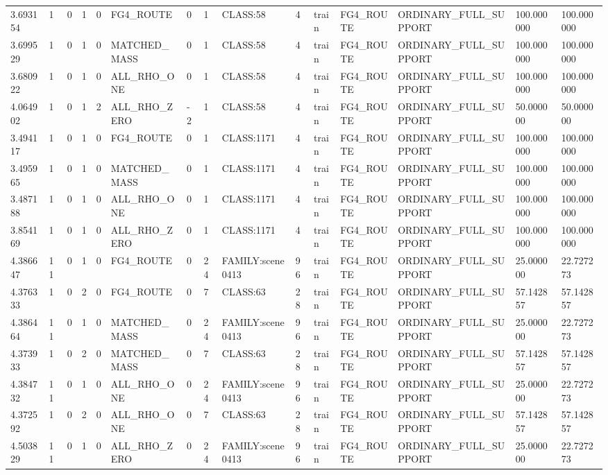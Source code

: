 \begin{tabular}{lllllllllllllll}
3.693154 & 1 & 0 & 1 & 0 & FG4\_ROUTE & 0 & 1 & CLASS:58 & 4 & train & FG4\_ROUTE & ORDINARY\_FULL\_SUPPORT & 100.000000 & 100.000000 \\
3.699529 & 1 & 0 & 1 & 0 & MATCHED\_MASS & 0 & 1 & CLASS:58 & 4 & train & FG4\_ROUTE & ORDINARY\_FULL\_SUPPORT & 100.000000 & 100.000000 \\
3.680922 & 1 & 0 & 1 & 0 & ALL\_RHO\_ONE & 0 & 1 & CLASS:58 & 4 & train & FG4\_ROUTE & ORDINARY\_FULL\_SUPPORT & 100.000000 & 100.000000 \\
4.064902 & 1 & 0 & 1 & 2 & ALL\_RHO\_ZERO & -2 & 1 & CLASS:58 & 4 & train & FG4\_ROUTE & ORDINARY\_FULL\_SUPPORT & 50.000000 & 50.000000 \\
3.494117 & 1 & 0 & 1 & 0 & FG4\_ROUTE & 0 & 1 & CLASS:1171 & 4 & train & FG4\_ROUTE & ORDINARY\_FULL\_SUPPORT & 100.000000 & 100.000000 \\
3.495965 & 1 & 0 & 1 & 0 & MATCHED\_MASS & 0 & 1 & CLASS:1171 & 4 & train & FG4\_ROUTE & ORDINARY\_FULL\_SUPPORT & 100.000000 & 100.000000 \\
3.487188 & 1 & 0 & 1 & 0 & ALL\_RHO\_ONE & 0 & 1 & CLASS:1171 & 4 & train & FG4\_ROUTE & ORDINARY\_FULL\_SUPPORT & 100.000000 & 100.000000 \\
3.854169 & 1 & 0 & 1 & 0 & ALL\_RHO\_ZERO & 0 & 1 & CLASS:1171 & 4 & train & FG4\_ROUTE & ORDINARY\_FULL\_SUPPORT & 100.000000 & 100.000000 \\
4.386647 & 11 & 0 & 1 & 0 & FG4\_ROUTE & 0 & 24 & FAMILY:scene0413 & 96 & train & FG4\_ROUTE & ORDINARY\_FULL\_SUPPORT & 25.000000 & 22.727273 \\
4.376333 & 1 & 0 & 2 & 0 & FG4\_ROUTE & 0 & 7 & CLASS:63 & 28 & train & FG4\_ROUTE & ORDINARY\_FULL\_SUPPORT & 57.142857 & 57.142857 \\
4.386464 & 11 & 0 & 1 & 0 & MATCHED\_MASS & 0 & 24 & FAMILY:scene0413 & 96 & train & FG4\_ROUTE & ORDINARY\_FULL\_SUPPORT & 25.000000 & 22.727273 \\
4.373933 & 1 & 0 & 2 & 0 & MATCHED\_MASS & 0 & 7 & CLASS:63 & 28 & train & FG4\_ROUTE & ORDINARY\_FULL\_SUPPORT & 57.142857 & 57.142857 \\
4.384732 & 11 & 0 & 1 & 0 & ALL\_RHO\_ONE & 0 & 24 & FAMILY:scene0413 & 96 & train & FG4\_ROUTE & ORDINARY\_FULL\_SUPPORT & 25.000000 & 22.727273 \\
4.372592 & 1 & 0 & 2 & 0 & ALL\_RHO\_ONE & 0 & 7 & CLASS:63 & 28 & train & FG4\_ROUTE & ORDINARY\_FULL\_SUPPORT & 57.142857 & 57.142857 \\
4.503829 & 11 & 0 & 1 & 0 & ALL\_RHO\_ZERO & 0 & 24 & FAMILY:scene0413 & 96 & train & FG4\_ROUTE & ORDINARY\_FULL\_SUPPORT & 25.000000 & 22.727273 \\

\end{tabular}
